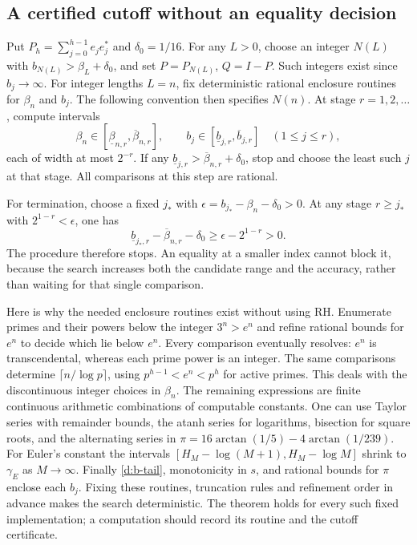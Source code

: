 \subsection{A certified cutoff without an equality decision}
Put $P_h=\sum_{j=0}^{h-1}e_je_j^*$ and $\delta_0=1/16$.
For any $L>0$, choose an integer $N(L)$ with $b_{N(L)}>\beta_L+\delta_0$,
and set $P=P_{N(L)}$, $Q=I-P$. Such integers exist since $b_j\to\infty$.
For integer lengths $L=n$, fix deterministic rational enclosure routines
for $\beta_n$ and $b_j$. The following convention then specifies $N(n)$.
At stage $r=1,2,\ldots$, compute intervals
\[
\beta_n\in[\underline\beta_{n,r},\overline\beta_{n,r}],
\qquad b_j\in[\underline b_{j,r},\overline b_{j,r}]
\quad(1\le j\le r),
\]
each of width at most $2^{-r}$. If any
$\underline b_{j,r}>\overline\beta_{n,r}+\delta_0$, stop and choose the
least such $j$ at that stage. All comparisons at this step are rational.

For termination, choose a fixed $j_*$ with
$\epsilon=b_{j_*}-\beta_n-\delta_0>0$. At any stage $r\ge j_*$
with $2^{1-r}<\epsilon$, one has
\[
\underline b_{j_*,r}-\overline\beta_{n,r}-\delta_0
\ge\epsilon-2^{1-r}>0.
\]
The procedure therefore stops. An equality at a smaller index cannot
block it, because the search increases both the candidate range and the
accuracy, rather than waiting for that single comparison.

Here is why the needed enclosure routines exist without using RH.
Enumerate primes and their powers below the integer $3^n>e^n$ and refine
rational bounds for $e^n$ to decide which lie below $e^n$. Every comparison
eventually resolves: $e^n$ is transcendental, whereas each prime power is
an integer. The same comparisons determine
$\lceil n/\log p\rceil$, using $p^{h-1}<e^n<p^h$ for active primes.
This deals with the discontinuous integer choices in $\beta_n$.
The remaining expressions are finite continuous arithmetic combinations
of computable constants. One can use Taylor series with remainder bounds,
the atanh series for logarithms, bisection for square roots, and the
alternating series in
$\pi=16\arctan(1/5)-4\arctan(1/239)$.
For Euler's constant the intervals
$[H_M-\log(M+1),H_M-\log M]$ shrink to $\gamma_E$ as $M\to\infty$.
Finally \eqref{d:b-tail}, monotonicity in $s$, and rational bounds for
$\pi$ enclose each $b_j$. Fixing these routines, truncation rules and
refinement order in advance makes the search deterministic.
The theorem holds for every such fixed implementation; a computation
should record its routine and the cutoff certificate.

